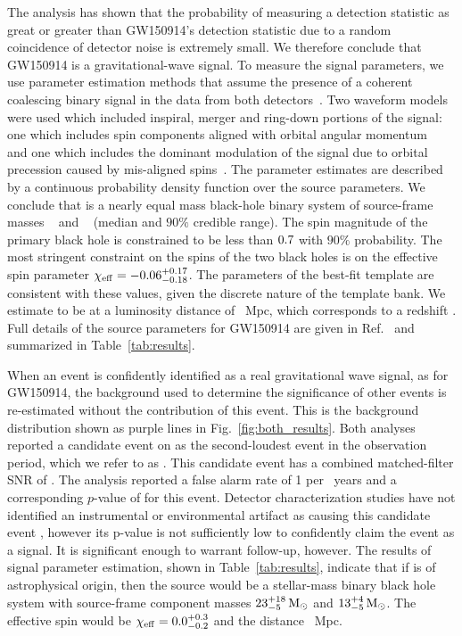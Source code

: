 The \pycbc{} analysis has shown that the probability of measuring a detection
statistic as great or greater than GW150914's detection statistic due
to a random coincidence of detector noise is extremely small. We therefore conclude
that GW150914 is a gravitational-wave signal. To measure the signal
parameters, we use parameter estimation methods that assume the presence of a
coherent coalescing binary signal in the data from both
detectors~\cite{Veitch:2014wba,GW150914-PARAMESTIM}. Two waveform models were
used which included inspiral, merger and ring-down portions of the signal: one
which includes spin components aligned with orbital angular
momentum~\cite{Pan:2009wj,Puerrer:2014fza} and one which includes the dominant
modulation of the signal due to orbital precession caused by mis-aligned
spins~\cite{Hannam:2013oca,Khan:2015jqa}.  The parameter estimates are
described by a continuous probability density function over the source
parameters. We conclude that \TheEvent{} is a nearly equal mass black-hole
binary system of source-frame masses {\MONESCOMPACT~\Msun} and
{\MTWOSCOMPACT~\Msun} (median and $90\%$ credible range). The spin magnitude
of the primary black hole is constrained to be less than ${0.7}$
with $90\%$ probability.  The most stringent constraint on the spins of the
two black holes is on the effective spin parameter $\chi_\mathrm{eff} =
-0.06_{-0.18}^{+0.17}$.  The parameters of the best-fit template are consistent with
these values, given the discrete nature of the template bank.  We estimate
\TheEvent{} to be at a luminosity distance of
{\DISTANCECOMPACT~$\mathrm{Mpc}$}, which corresponds to a redshift
{\REDSHIFTCOMPACT}.  Full details of the source parameters for GW150914 are
given in Ref.~\cite{GW150914-PARAMESTIM} and summarized in
Table~\ref{tab:results}.

When an event is confidently identified as a real gravitational wave signal,
as for GW150914, the background used to determine the significance of other
events is re-estimated without the contribution of this event. This is the
background distribution shown as purple lines in Fig.~\ref{fig:both_results}.
Both analyses reported a candidate event on \SecondTime{} as the
second-loudest event in the observation period, which we refer to as
\SECONDMONDAY. This candidate event has a combined matched-filter SNR of
\PyCBCSecondEventRhoC.  The \pycbc{} analysis reported a false alarm rate of 1
per \CBCSECONDEVENTIFAR~years and a corresponding $p$-value of
\CBCSECONDEVENTFAP{} for this event.
Detector characterization studies have not identified an
instrumental or environmental artifact as causing this candidate event
\cite{GW150914-DETCHAR}, however its p-value is not
sufficiently low to confidently claim the event as a signal.  It is
significant enough to warrant follow-up, however.  The results of signal
parameter estimation, shown in Table~\ref{tab:results}, indicate that if
\SECONDMONDAY{} is of astrophysical origin, then the source would be a
stellar-mass binary black hole system with source-frame component masses
$23_{-5}^{+18}\,\mathrm{M}_\odot$ and $13_{-5}^{+4}\,\mathrm{M}_\odot$. The
effective spin would be $\chi_\mathrm{eff} = 0.0_{-0.2}^{+0.3}$ and
the distance \DISTANCECOMPACTSecondMonday~Mpc.

